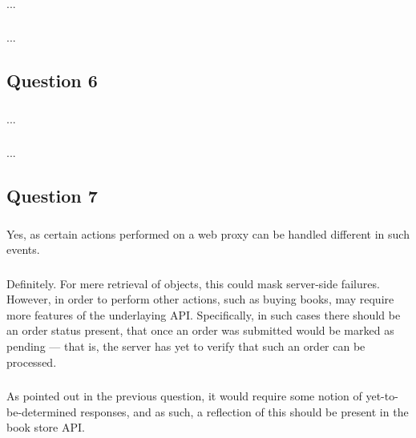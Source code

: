 \subsubsection{}
...

\subsubsection{}
...

\subsection{Question 6}

\subsubsection{}
...

\subsubsection{}
...

\subsection{Question 7}

\subsubsection{}
Yes, as certain actions performed on a web proxy can be handled different in
such events.

\subsubsection{}
Definitely. For mere retrieval of objects, this could mask server-side
failures. However, in order to perform other actions, such as buying books,
may require more features of the underlaying API. Specifically, in such cases
there should be an order status present, that once an order was submitted would
be marked as pending --- that is, the server has yet to verify that such an
order can be processed.

\subsubsection{}
As pointed out in the previous question, it would require some notion of
yet-to-be-determined responses, and as such, a reflection of this should be
present in the book store API.


